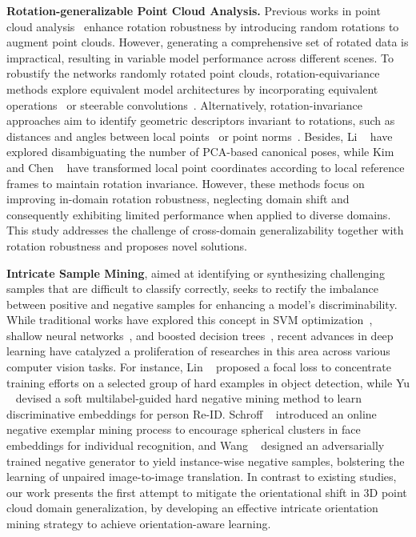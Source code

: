 \noindent\textbf{Rotation-generalizable Point Cloud Analysis.}
Previous works in point cloud analysis~\cite{qi2017pointnet, wang2019dynamic} enhance rotation robustness by introducing random rotations to augment point clouds. {However, generating a comprehensive set of rotated data is impractical, resulting in variable model performance across different scenes. To robustify the networks \wrt randomly rotated point clouds,} rotation-equivariance methods explore equivalent model architectures by incorporating equivalent operations~\cite{su2022svnet, Deng_2021_ICCV, luo2022equivariant} or steerable convolutions~\cite{chen2021equivariant, poulenard2021functional}.
Alternatively, rotation-invariance approaches aim to identify geometric descriptors invariant to rotations, such as distances and angles between local points~\cite{chen2019clusternet, zhang2020global} or point norms~\cite{zhao2019rotation, li2021rotation}. Besides, {Li \etal~\cite{li2021closer} have explored disambiguating the number of PCA-based canonical poses, while Kim \etal~\cite{kim2020rotation} and Chen \etal~\cite{chen2022devil} have transformed local point coordinates according to local reference frames to maintain rotation invariance. However, these methods focus on improving in-domain rotation robustness, neglecting domain shift and consequently exhibiting limited performance when applied to diverse domains. This study addresses the challenge of cross-domain generalizability together with rotation robustness and proposes novel solutions.} 

\noindent\textbf{Intricate Sample Mining}, aimed at identifying or synthesizing challenging samples that are difficult to classify correctly, seeks to rectify the imbalance between positive and negative samples for enhancing a model's discriminability. While traditional works have explored this concept in SVM optimization~\cite{felzenszwalb2009object}, shallow neural networks~\cite{dollar2009integral}, and boosted decision trees~\cite{yu2019unsupervised}, recent advances in deep learning have catalyzed a proliferation of researches in this area across various computer vision tasks. For instance, 
Lin \etal~\cite{lin2017focal} proposed a focal loss to concentrate training efforts on a selected group of hard examples in object detection, while Yu \etal~\cite{yu2019unsupervised} devised a soft multilabel-guided hard negative mining method to learn discriminative embeddings for person Re-ID. Schroff \etal~\cite{schroff2015facenet} introduced an online negative exemplar mining process to encourage spherical clusters in face embeddings for individual recognition, and Wang \etal~\cite{wang2021instance} designed an adversarially trained negative generator to yield instance-wise negative samples, bolstering the learning of unpaired image-to-image translation. In contrast to existing studies, our work presents the first attempt to mitigate the orientational shift in 3D point cloud domain generalization, by developing an effective intricate orientation mining strategy to achieve orientation-aware learning.